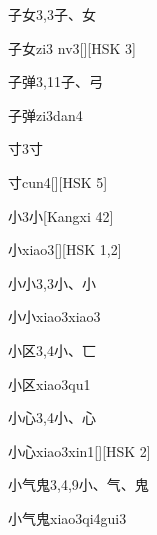 \begin{entry}{子女}{3,3}{⼦、⼥}
  \begin{phonetics}{子女}{zi3 nv3}[][HSK 3]
  \end{phonetics}
\end{entry}

\begin{entry}{子弹}{3,11}{⼦、⼸}
  \begin{phonetics}{子弹}{zi3dan4}
  \end{phonetics}
\end{entry}

\begin{entry}{寸}{3}{⼨}
  \begin{phonetics}{寸}{cun4}[][HSK 5]
  \end{phonetics}
\end{entry}

\begin{entry}{小}{3}{⼩}[Kangxi 42]
  \begin{phonetics}{小}{xiao3}[][HSK 1,2]
  \end{phonetics}
\end{entry}

\begin{entry}{小小}{3,3}{⼩、⼩}
  \begin{phonetics}{小小}{xiao3xiao3}
  \end{phonetics}
\end{entry}

\begin{entry}{小区}{3,4}{⼩、⼖}
  \begin{phonetics}{小区}{xiao3qu1}
  \end{phonetics}
\end{entry}

\begin{entry}{小心}{3,4}{⼩、⼼}
  \begin{phonetics}{小心}{xiao3xin1}[][HSK 2]
  \end{phonetics}
\end{entry}

\begin{entry}{小气鬼}{3,4,9}{⼩、⽓、⿁}
  \begin{phonetics}{小气鬼}{xiao3qi4gui3}
  \end{phonetics}
\end{entry}

